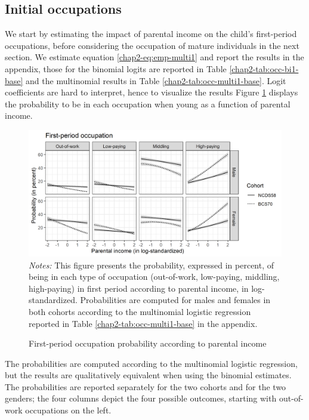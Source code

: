 \subsection{Initial occupations} \label{chap2-initial}

We start by estimating the impact of parental income on the child's first-period occupations, before considering the occupation of mature individuals in the next section. We estimate equation \eqref{chap2-eq:emp-multi1} and report the results in the appendix, those for the binomial logits are reported in Table \ref{chap2-tab:occ-bi1-base} and the multinomial results in Table \ref{chap2-tab:occ-multi1-base}.  Logit coefficients are hard to interpret, hence to visualize the results Figure \ref{chap2-fig:occ-multi1-pinc} displays the probability to be in each occupation when young as a function of parental income.
\begin{figure}[!tb]
    \centering
    \caption{First-period occupation probability according to parental income}
    \label{chap2-fig:occ-multi1-pinc}
    \includegraphics[width=\linewidth]{chap2/graphic/occ-multi1-pinc.png}
    \vspace{-3em}
	\justify\singlespacing\footnotesize{\textit{Notes:} This figure presents the probability, expressed in percent, of being in each type of occupation (out-of-work, low-paying, middling, high-paying) in first period according to parental income, in log-standardized.
	Probabilities are computed for males and females in both cohorts according to the multinomial logistic regression reported in Table \ref{chap2-tab:occ-multi1-base} in the appendix.}
\end{figure}
The probabilities are computed according to the multinomial logistic regression, but the results are qualitatively equivalent when using the binomial estimates. The probabilities are reported separately for the two cohorts and for the two genders; the four columns depict the four possible outcomes, starting with out-of-work occupations on the left.

